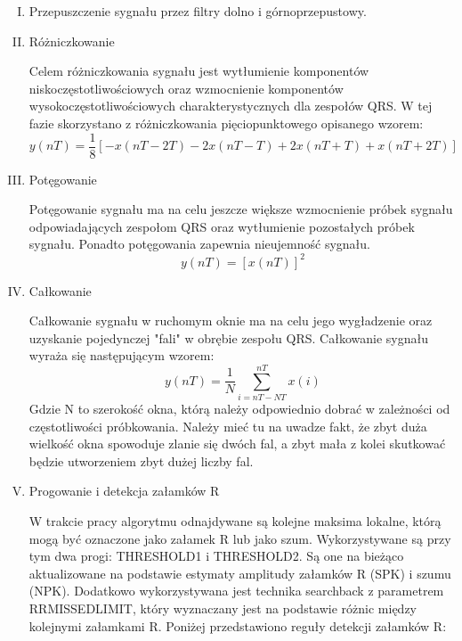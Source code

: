 \begin{enumerate}[I.]
\item Przepuszczenie sygnału przez filtry dolno i górnoprzepustowy.
\item Różniczkowanie

Celem różniczkowania sygnału jest wytłumienie komponentów niskoczęstotliwościowych oraz wzmocnienie komponentów wysokoczęstotliwościowych charakterystycznych dla zespołów QRS. W tej fazie skorzystano z różniczkowania pięciopunktowego opisanego wzorem:
\begin{equation}
y(nT)=\frac{1}{8}[-x(nT-2T)-2x(nT-T)+2x(nT+T)+x(nT+2T)]
\end{equation}
\item Potęgowanie

Potęgowanie sygnału ma na celu jeszcze większe wzmocnienie próbek sygnału odpowiadających zespołom QRS oraz wytłumienie pozostałych próbek sygnału. Ponadto potęgowania zapewnia nieujemność sygnału.
\begin{equation}
y(nT)=[x(nT)]^2
\end{equation}
\item Całkowanie

Całkowanie sygnału w ruchomym oknie ma na celu jego wygładzenie oraz uzyskanie pojedynczej "fali" w obrębie zespołu QRS. Całkowanie sygnału wyraża się następującym wzorem:
\begin{equation}
y(nT)=\frac{1}{N}\sum\limits_{i=nT-NT}^{nT} x(i)
\end{equation}
Gdzie N to szerokość okna, którą należy odpowiednio dobrać w zależności od częstotliwości próbkowania. Należy mieć tu na uwadze fakt, że zbyt duża wielkość okna spowoduje zlanie się dwóch fal, a zbyt mała z kolei skutkować będzie utworzeniem zbyt dużej liczby fal.
\item Progowanie i detekcja załamków R

W trakcie pracy algorytmu odnajdywane są kolejne maksima lokalne, którą mogą być oznaczone jako załamek R lub jako szum. Wykorzystywane są przy tym dwa progi: THRESHOLD1 i THRESHOLD2. Są one na bieżąco aktualizowane na podstawie estymaty amplitudy załamków R (SPK) i szumu (NPK). Dodatkowo wykorzystywana jest technika searchback z parametrem RRMISSEDLIMIT, który wyznaczany jest na podstawie różnic między kolejnymi załamkami R. Poniżej przedstawiono reguły detekcji załamków R:


\end{enumerate}
